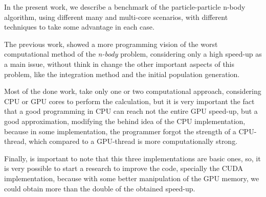 In the present work, we describe a benchmark
of the particle-particle n-body algorithm,
using different many and multi-core scenarios,
with different techniques to take some advantage
in each case.

The previous work, showed a more programming vision
of the worst computational method of the \emph{n-body} problem,
considering only a high speed-up as a main issue,
without think in change the other important aspects
of this problem, like the integration method and
the initial population generation.

Most of the done work,
take only one or two computational approach,
considering CPU or GPU cores to perform the calculation,
but it is very important the fact that a good programming
in CPU can reach not the entire GPU speed-up, but a good
approximation, modifying the behind idea of the CPU implementation,
because in some implementation, the programmer forgot the strength
of a CPU-thread, which compared to a GPU-thread is more computationally strong.

Finally, is important to note that this three implementations
are basic ones, so, it is very possible to start a research to improve
the code, specially the CUDA implementation, because with some better
manipulation of the GPU memory, we could obtain more than the double
of the obtained speed-up.
